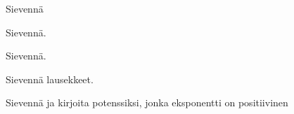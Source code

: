 \begin{tehtavasivu}
 \begin{tehtava}
        Sievennä

        \begin{vastaus}
        \end{vastaus}
    \end{tehtava}
    \begin{tehtava}
        Sievennä.
        \begin{vastaus}
        \end{vastaus}
    \end{tehtava}

    \begin{tehtava}
        Sievennä.
        \begin{vastaus}
        \end{vastaus}
    \end{tehtava}
      
    \begin{tehtava}
        Sievennä lausekkeet.
        \begin{vastaus}
        \end{vastaus}
    \end{tehtava}
    
    \begin{tehtava}
         Sievennä ja kirjoita potenssiksi, jonka eksponentti on positiivinen
        

\end{tehtava}
\end{tehtavasivu}
